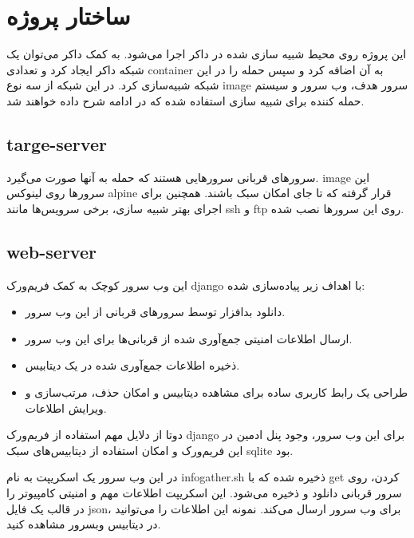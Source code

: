 \documentclass[11pt]{article}
\begin{document}
\section{ساختار پروژه}

این پروژه روی محیط شبیه سازی شده در داکر اجرا می‌شود. به کمک داکر می‌توان یک شبکه داکر ایجاد کرد و تعدادی container به آن اضافه کرد و سپس حمله را در این شبکه شبیه‌سازی کرد. در این شبکه از سه نوع image سرور هدف، وب سرور و سیستم حمله کننده برای شبیه سازی استفاده شده که در ادامه شرح داده خواهند شد.

\subsection{targe-server}
سرورهای قربانی سرورهایی هستند که حمله به آنها صورت می‌گیرد. image این سرورها روی لینوکس alpine قرار گرفته که تا جای امکان سبک باشند. همچنین برای اجرای بهتر شبیه سازی، برخی سرویس‌ها مانند ssh و ftp روی این سرورها نصب شده.

\subsection{web-server}
این وب سرور کوچک به کمک فریم‌ورک django با اهداف زیر پیاده‌سازی شده:


\begin{itemize}
    \item دانلود بدافزار توسط سرورهای قربانی از این وب سرور.
    \item ارسال اطلاعات امنیتی جمع‌آوری شده از قربانی‌ها برای این وب سرور.
    \item ذخیره اطلاعات جمع‌آوری شده در یک دیتابیس.
	\item طراحی یک رابط کاربری ساده برای مشاهده دیتابیس و امکان حذف، مرتب‌سازی و ویرایش اطلاعات.
\end{itemize}

دوتا از دلایل مهم استفاده از فریم‌ورک django برای این وب سرور، وجود پنل ادمین در این فریم‌ورک و امکان استفاده از دیتابیس‌های سبک sqlite بود.

در این وب سرور یک اسکریپت به نام infogather.sh ذخیره شده که با get کردن، روی سرور قربانی دانلود و ذخیره می‌شود. این اسکریپت اطلاعات مهم و امنیتی کامپیوتر را در قالب یک فایل json، برای وب سرور ارسال می‌کند. نمونه این اطلاعات را می‌توانید در دیتابیس وبسرور مشاهده کنید.
\end{document}
